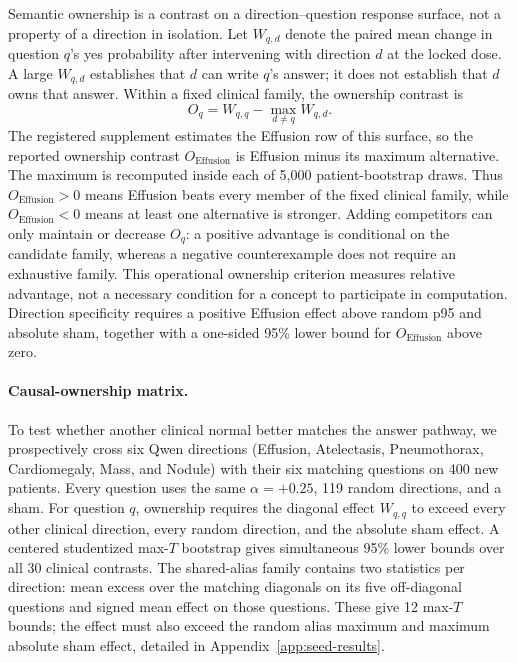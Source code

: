\documentclass{article}
\begin{document}
Semantic ownership is a contrast on a direction--question response surface, not a property of a direction in isolation. Let $W_{q,d}$ denote the paired mean change in question $q$'s yes probability after intervening with direction $d$ at the locked dose. A large $W_{q,d}$ establishes that $d$ can write $q$'s answer; it does not establish that $d$ owns that answer. Within a fixed clinical family, the ownership contrast is
\begin{equation}
O_q=W_{q,q}-\max_{d\neq q}W_{q,d}.
\label{eq:seed-margin}
\end{equation}
The registered supplement estimates the Effusion row of this surface, so the reported ownership contrast $O_{\mathrm{Effusion}}$ is Effusion minus its maximum alternative. The maximum is recomputed inside each of 5,000 patient-bootstrap draws. Thus $O_{\mathrm{Effusion}}>0$ means Effusion beats every member of the fixed clinical family, while $O_{\mathrm{Effusion}}<0$ means at least one alternative is stronger. Adding competitors can only maintain or decrease $O_q$: a positive advantage is conditional on the candidate family, whereas a negative counterexample does not require an exhaustive family. This operational ownership criterion measures relative advantage, not a necessary condition for a concept to participate in computation. Direction specificity requires a positive Effusion effect above random p95 and absolute sham, together with a one-sided 95\% lower bound for $O_{\mathrm{Effusion}}$ above zero.

\paragraph{Causal-ownership matrix.}
To test whether another clinical normal better matches the answer pathway, we prospectively cross six Qwen directions (Effusion, Atelectasis, Pneumothorax, Cardiomegaly, Mass, and Nodule) with their six matching questions on 400 new patients. Every question uses the same $\alpha=+0.25$, 119 random directions, and a sham. For question $q$, ownership requires the diagonal effect $W_{q,q}$ to exceed every other clinical direction, every random direction, and the absolute sham effect. A centered studentized max-$T$ bootstrap gives simultaneous 95\% lower bounds over all 30 clinical contrasts. The shared-alias family contains two statistics per direction: mean excess over the matching diagonals on its five off-diagonal questions and signed mean effect on those questions. These give 12 max-$T$ bounds; the effect must also exceed the random alias maximum and maximum absolute sham effect, detailed in Appendix~\ref{app:seed-results}.
\end{document}

